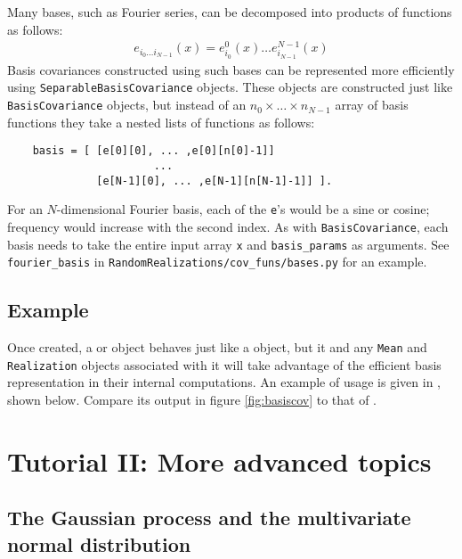 \documentclass[]{manual}
\begin{document}
Many bases, such as Fourier series, can be decomposed into products of functions as follows:
\begin{eqnarray*}
    e_{i_0\ldots i_{N-1}}(x) = e^0_{i_0}(x)\ldots e^{N-1}_{i_{N-1}}(x)
\end{eqnarray*}
Basis covariances constructed using such bases can be represented more efficiently using \texttt{SeparableBasisCovariance} objects. These objects are constructed just like \texttt{BasisCovariance} objects, but instead of an $n_0\times \ldots \times n_{N-1}$ array of basis functions they take a nested lists of functions as follows:
\begin{verbatim}
    basis = [ [e[0][0], ... ,e[0][n[0]-1]]
                       ...
              [e[N-1][0], ... ,e[N-1][n[N-1]-1]] ].
\end{verbatim}
For an $N$-dimensional Fourier basis, each of the \texttt{e}'s would be a sine or cosine; frequency would increase with the second index. As with \texttt{BasisCovariance}, each basis needs to take the entire input array \texttt{x} and \texttt{basis_params} as arguments. See \texttt{fourier_basis} in \texttt{RandomRealizations/cov_funs/bases.py} for an example.

\section{Example} 

Once created, a  or  object behaves just like a  object, but it and any \texttt{Mean} and \texttt{Realization} objects associated with it will take advantage of the efficient basis representation in their internal computations. An example of  usage is given in , shown below. Compare its output in figure \ref{fig:basiscov} to that of . 




\chapter{Tutorial II: More advanced topics}\label{cha:adv} %

\section{The Gaussian process and the multivariate normal distribution} 
\end{document}
